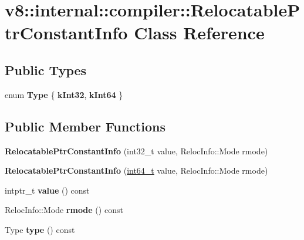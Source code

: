 \hypertarget{classv8_1_1internal_1_1compiler_1_1RelocatablePtrConstantInfo}{}\section{v8\+:\+:internal\+:\+:compiler\+:\+:Relocatable\+Ptr\+Constant\+Info Class Reference}
\label{classv8_1_1internal_1_1compiler_1_1RelocatablePtrConstantInfo}
\subsection*{Public Types}
\begin{DoxyCompactItemize}
\item 
\mbox{\label{classv8_1_1internal_1_1compiler_1_1RelocatablePtrConstantInfo_a249b0134162750cb15516a3db3f8a131}} 
enum {\bfseries Type} \{ {\bfseries k\+Int32}, 
{\bfseries k\+Int64}
 \}
\end{DoxyCompactItemize}
\subsection*{Public Member Functions}
\begin{DoxyCompactItemize}
\item 
\mbox{\label{classv8_1_1internal_1_1compiler_1_1RelocatablePtrConstantInfo_ac908b7c6dba7a02fb8fb8778b41eb781}} 
{\bfseries Relocatable\+Ptr\+Constant\+Info} (int32\+\_\+t value, Reloc\+Info\+::\+Mode rmode)
\item 
\mbox{\label{classv8_1_1internal_1_1compiler_1_1RelocatablePtrConstantInfo_a8e8fbcf5a77010576da0526be86c4ee7}} 
{\bfseries Relocatable\+Ptr\+Constant\+Info} (\mbox{\hyperlink{classint64__t}{int64\+\_\+t}} value, Reloc\+Info\+::\+Mode rmode)
\item 
\mbox{\label{classv8_1_1internal_1_1compiler_1_1RelocatablePtrConstantInfo_a0181dff9072fcf67609c3a9c6e804bfb}} 
intptr\+\_\+t {\bfseries value} () const
\item 
\mbox{\label{classv8_1_1internal_1_1compiler_1_1RelocatablePtrConstantInfo_a3234485bf3f31cd1f1cf671a24d9fae4}} 
Reloc\+Info\+::\+Mode {\bfseries rmode} () const
\item 
\mbox{\label{classv8_1_1internal_1_1compiler_1_1RelocatablePtrConstantInfo_aac906baf4ac692f537e25a845e8c80a8}} 
Type {\bfseries type} () const
\end{DoxyCompactItemize}


